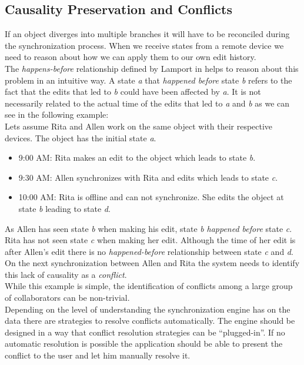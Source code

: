 \subsection{Causality Preservation and Conflicts}
If an object diverges into multiple branches it will have to be reconciled during the synchronization process.
When we receive states from a remote device we need to reason about how we can apply them to our own edit history.\\
The \emph{happens-before} relationship defined by Lamport in \cite{Lamport:1978tr} helps to reason about this problem in an intuitive way.
A state \emph{a} that \emph{happened before} state \emph{b} refers to the fact that the edits that led to \emph{b} could have been affected by \emph{a}.
It is not necessarily related to the actual time of the edits that led to \emph{a} and \emph{b} as we can see in the following example:\\

Lets assume Rita and Allen work on the same object with their respective devices.
The object has the initial state \emph{a}.

\begin{itemize}
\item 9:00 AM: Rita makes an edit to the object which leads to state \emph{b}.
\item 9:30 AM: Allen synchronizes with Rita and edits which leads to state \emph{c}.
\item 10:00 AM: Rita is offline and can not synchronize. She edits the object at state \emph{b} leading to state \emph{d}. 
\end{itemize}

As Allen has seen state \emph{b} when making his edit, state \emph{b} \emph{happened before} state \emph{c}.\\
Rita has not seen state \emph{c} when making her edit.
Although the time of her edit is after Allen's edit there is no \emph{happened-before} relationship between state \emph{c} and \emph{d}.\\
On the next synchronization between Allen and Rita the system needs to identify this lack of causality as a \emph{conflict}.\\
While this example is simple, the identification of conflicts among a large group of collaborators can be non-trivial.\\
Depending on the level of understanding the synchronization engine has on the data there are strategies to resolve conflicts automatically.
The engine should be designed in a way that conflict resolution strategies can be ``plugged-in''.
If no automatic resolution is possible the application should be able to present the conflict to the user and let him manually resolve it.

